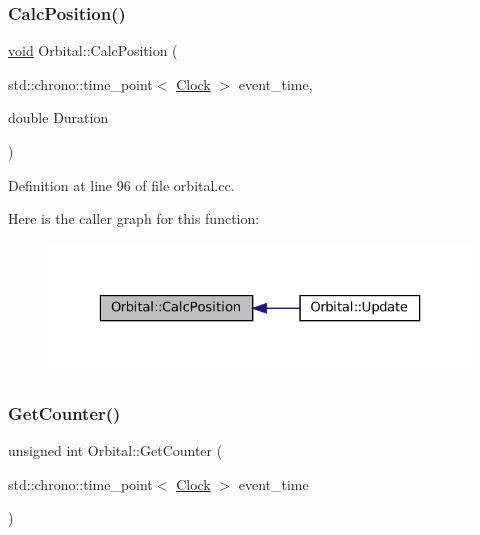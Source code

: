 \subsubsection{\texorpdfstring{Calc\+Position()}{CalcPosition()}}
{\footnotesize\ttfamily \mbox{\hyperlink{glad_8h_a950fc91edb4504f62f1c577bf4727c29}{void}} Orbital\+::\+Calc\+Position (\begin{DoxyParamCaption}\item[{std\+::chrono\+::time\+\_\+point$<$ \mbox{\hyperlink{universe_8h_a0ef8d951d1ca5ab3cfaf7ab4c7a6fd80}{Clock}} $>$}]{event\+\_\+time,  }\item[{double}]{Duration }\end{DoxyParamCaption})}



Definition at line 96 of file orbital.\+cc.

Here is the caller graph for this function\+:\nopagebreak
\begin{figure}[H]
\begin{center}
\leavevmode
\includegraphics[width=323pt]{class_orbital_a5aa5edbae517ff393fc1eb0ae2422123_icgraph}
\end{center}
\end{figure}
\mbox{\label{class_orbital_ae46443496d38a22f1da8f7f063d420bc}} 
\subsubsection{\texorpdfstring{Get\+Counter()}{GetCounter()}}
{\footnotesize\ttfamily unsigned int Orbital\+::\+Get\+Counter (\begin{DoxyParamCaption}\item[{std\+::chrono\+::time\+\_\+point$<$ \mbox{\hyperlink{universe_8h_a0ef8d951d1ca5ab3cfaf7ab4c7a6fd80}{Clock}} $>$}]{event\+\_\+time }\end{DoxyParamCaption})\hspace{0.3cm}{\ttfamily [inline]}}



